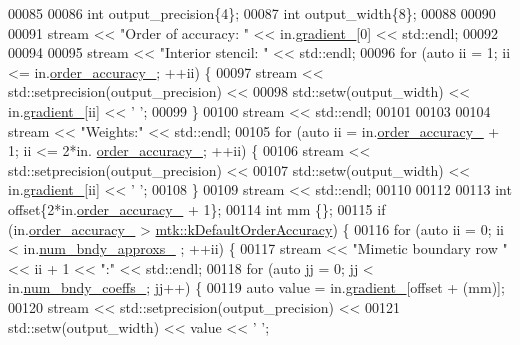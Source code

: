 \begin{DoxyCode}
00085 
00086   \textcolor{keywordtype}{int} output\_precision\{4\};
00087   \textcolor{keywordtype}{int} output\_width\{8\};
00088 
00090 
00091   stream << \textcolor{stringliteral}{"Order of accuracy: "} << in.\hyperlink{classmtk_1_1Grad1D_a024b84b1ea285c0c590eb42d40ff4469}{gradient\_}[0] << std::endl;
00092 
00094 
00095   stream << \textcolor{stringliteral}{"Interior stencil: "} << std::endl;
00096   \textcolor{keywordflow}{for} (\textcolor{keyword}{auto} ii = 1; ii <= in.\hyperlink{classmtk_1_1Grad1D_a545e9c865e5d4716f2684a64f744c78c}{order\_accuracy\_}; ++ii) \{
00097     stream << std::setprecision(output\_precision) <<
00098         std::setw(output\_width) << in.\hyperlink{classmtk_1_1Grad1D_a024b84b1ea285c0c590eb42d40ff4469}{gradient\_}[ii] << \textcolor{charliteral}{' '};
00099   \}
00100   stream << std::endl;
00101 
00103 
00104   stream << \textcolor{stringliteral}{"Weights:"} << std::endl;
00105   \textcolor{keywordflow}{for} (\textcolor{keyword}{auto} ii = in.\hyperlink{classmtk_1_1Grad1D_a545e9c865e5d4716f2684a64f744c78c}{order\_accuracy\_} + 1; ii <= 2*in.
      \hyperlink{classmtk_1_1Grad1D_a545e9c865e5d4716f2684a64f744c78c}{order\_accuracy\_}; ++ii) \{
00106     stream << std::setprecision(output\_precision) <<
00107         std::setw(output\_width) << in.\hyperlink{classmtk_1_1Grad1D_a024b84b1ea285c0c590eb42d40ff4469}{gradient\_}[ii] << \textcolor{charliteral}{' '};
00108   \}
00109   stream << std::endl;
00110 
00112 
00113   \textcolor{keywordtype}{int} offset\{2*in.\hyperlink{classmtk_1_1Grad1D_a545e9c865e5d4716f2684a64f744c78c}{order\_accuracy\_} + 1\};
00114   \textcolor{keywordtype}{int} mm \{\};
00115   \textcolor{keywordflow}{if} (in.\hyperlink{classmtk_1_1Grad1D_a545e9c865e5d4716f2684a64f744c78c}{order\_accuracy\_} > \hyperlink{group__c01-roots_ga0d95560098eb36420511103637b6952f}{mtk::kDefaultOrderAccuracy}) \{
00116     \textcolor{keywordflow}{for} (\textcolor{keyword}{auto} ii = 0; ii < in.\hyperlink{classmtk_1_1Grad1D_abe15c1ffd9dfaba1a65f4f0e096287ce}{num\_bndy\_approxs\_} ; ++ii) \{
00117       stream << \textcolor{stringliteral}{"Mimetic boundary row "} << ii + 1 << \textcolor{stringliteral}{":"} << std::endl;
00118       \textcolor{keywordflow}{for} (\textcolor{keyword}{auto} jj = 0; jj < in.\hyperlink{classmtk_1_1Grad1D_a60c560882bc601f9ab1d4cd5331e55ef}{num\_bndy\_coeffs\_}; jj++) \{
00119         \textcolor{keyword}{auto} value = in.\hyperlink{classmtk_1_1Grad1D_a024b84b1ea285c0c590eb42d40ff4469}{gradient\_}[offset + (mm)];
00120         stream << std::setprecision(output\_precision) <<
00121         std::setw(output\_width) << value << \textcolor{charliteral}{' '};

\end{DoxyCode}
